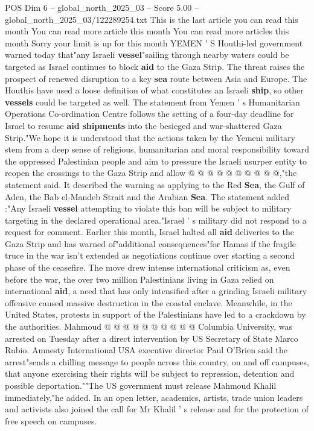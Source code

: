 \begin{textsample}{POS Dim 6 – global\_north\_2025\_03 – Score 5.00 – global\_north\_2025\_03/122289254.txt}  \label{ex:f6_pos_277}
This is the last article you can read this month You can read more article this month You can read more articles this month Sorry your limit is up for this month YEMEN ' S Houthi-led government warned today that"any Israeli \textbf{vessel}"sailing through nearby waters could be targeted as Israel continues to block \textbf{aid} to the Gaza Strip.
The threat raises the prospect of renewed disruption to a key \textbf{sea} route between Asia and Europe.
The Houthis have used a loose definition of what constitutes an Israeli \textbf{ship}, so other \textbf{vessels} could be targeted as well.
The statement from Yemen ' s Humanitarian Operations Co-ordination Centre follows the setting of a four-day deadline for Israel to resume \textbf{aid} \textbf{shipments} into the besieged and war-shattered Gaza Strip."We hope it is understood that the actions taken by the Yemeni military stem from a deep sense of religious, humanitarian and moral responsibility toward the oppressed Palestinian people and aim to pressure the Israeli usurper entity to reopen the crossings to the Gaza Strip and allow @ @ @ @ @ @ @ @ @ @,"the statement said.
It described the warning as applying to the Red \textbf{Sea}, the Gulf of Aden, the Bab el-Mandeb Strait and the Arabian \textbf{Sea}.
The statement added :"Any Israeli \textbf{vessel} attempting to violate this ban will be subject to military targeting in the declared operational area."Israel ' s military did not respond to a request for comment.
Earlier this month, Israel halted all \textbf{aid} deliveries to the Gaza Strip and has warned of"additional consequences"for Hamas if the fragile truce in the war isn't extended as negotiations continue over starting a second phase of the ceasefire.
The move drew intense international criticism as, even before the war, the over two million Palestinians living in Gaza relied on international \textbf{aid}, a need that has only intensified after a grinding Israeli military offensive caused massive destruction in the coastal enclave.
Meanwhile, in the United States, protests in support of the Palestinians have led to a crackdown by the authorities.
Mahmoud @ @ @ @ @ @ @ @ @ @ Columbia University, was arrested on Tuesday after a direct intervention by US Secretary of State Marco Rubio.
Amnesty International USA executive director Paul O'Brien said the arrest"sends a chilling message to people across this country, on and off campuses, that anyone exercising their rights will be subject to repression, detention and possible deportation.""The US government must release Mahmoud Khalil immediately,"he added.
In an open letter, academics, artists, trade union leaders and activists also joined the call for Mr Khalil ' s release and for the protection of free speech on campuses.

\end{textsample}
